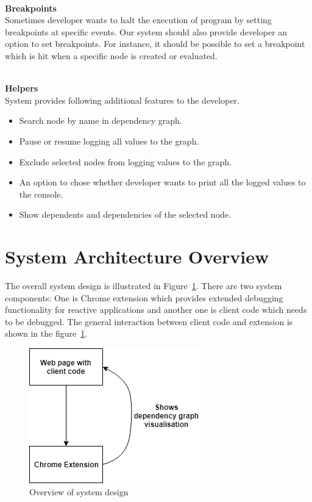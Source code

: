 \leavevmode
\\
\textbf{Breakpoints}
\\
Sometimes developer wants to halt the execution of program by setting breakpoints at specific events. Our system should also provide developer an option to set breakpoints. For instance, it should be possible to set a breakpoint which is hit when a specific node is created or evaluated. 

\leavevmode
\\
\textbf{Helpers}
\\
System provides following additional features to the developer.

\begin{itemize}
	\item Search node by name in dependency graph.
	\item Pause or resume logging all values to the graph.
	\item Exclude selected nodes from logging values to the graph.
	\item An option to chose whether developer wants to print all the logged values to the console.
	\item Show dependents and dependencies of the selected node.
\end{itemize}

\section{System Architecture Overview}
The overall system design is illustrated in Figure~\ref{fig:system-design}. There are two system components: One is Chrome extension which provides extended debugging functionality for reactive applications and another one is client code which needs to be debugged. The general interaction between client code and extension is shown in the figure~\ref{fig:system-design}. 

\begin{figure}[!h]
	\centering
	\includegraphics[scale=0.5,trim=0 0 0 0]{images/system-design.png}
	\caption{Overview of system design}
	\label{fig:system-design}
\end{figure}

